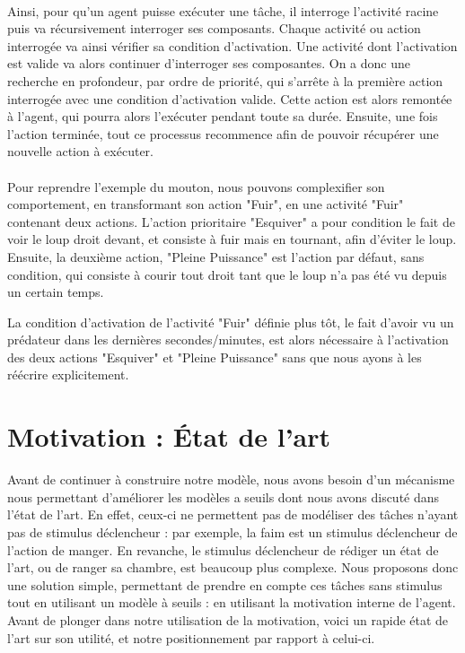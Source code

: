 		\paragraph{}
			Ainsi, pour qu'un agent puisse exécuter une tâche, il interroge l'activité racine puis va récursivement interroger ses composants. Chaque activité ou action interrogée va ainsi vérifier sa condition d'activation. Une activité dont l'activation est valide va alors continuer d'interroger ses composantes. On a donc une recherche en profondeur, par ordre de priorité, qui s'arrête à la première action interrogée avec une condition d'activation valide. Cette action est alors remontée à l'agent, qui pourra alors l'exécuter pendant toute sa durée. Ensuite, une fois l'action terminée, tout ce processus recommence afin de pouvoir récupérer une nouvelle action à exécuter.
			
			\paragraph{}
			Pour reprendre l'exemple du mouton, nous pouvons complexifier son comportement, en transformant son action "Fuir", en une activité "Fuir" contenant deux actions. L'action prioritaire "Esquiver" a pour condition le fait de voir le loup droit devant, et consiste à fuir mais en tournant, afin d'éviter le loup. Ensuite, la deuxième action, "Pleine Puissance" est l'action par défaut, sans condition, qui consiste à courir tout droit tant que le loup n'a pas été vu depuis un certain temps.
			
			La condition d'activation de l'activité "Fuir" définie plus tôt, le fait d'avoir vu un prédateur dans les dernières secondes/minutes, est alors nécessaire à l'activation des deux actions "Esquiver" et "Pleine Puissance" sans que nous ayons à les réécrire explicitement.
			
	\section{Motivation : État de l'art}

Avant de continuer à construire notre modèle, nous avons besoin d'un mécanisme nous permettant d'améliorer les modèles a seuils dont nous avons discuté dans l'état de l'art. En effet, ceux-ci ne permettent pas de modéliser des tâches n'ayant pas de stimulus déclencheur : par exemple, la faim est un stimulus déclencheur de l'action de manger. En revanche, le stimulus déclencheur de rédiger un état de l'art, ou de ranger sa chambre, est beaucoup plus complexe. Nous proposons donc une solution simple, permettant de prendre en compte ces tâches sans stimulus tout en utilisant un modèle à seuils : en utilisant la motivation interne de l'agent. Avant de plonger dans notre utilisation de la motivation, voici un rapide état de l'art sur son utilité, et notre positionnement par rapport à celui-ci.

